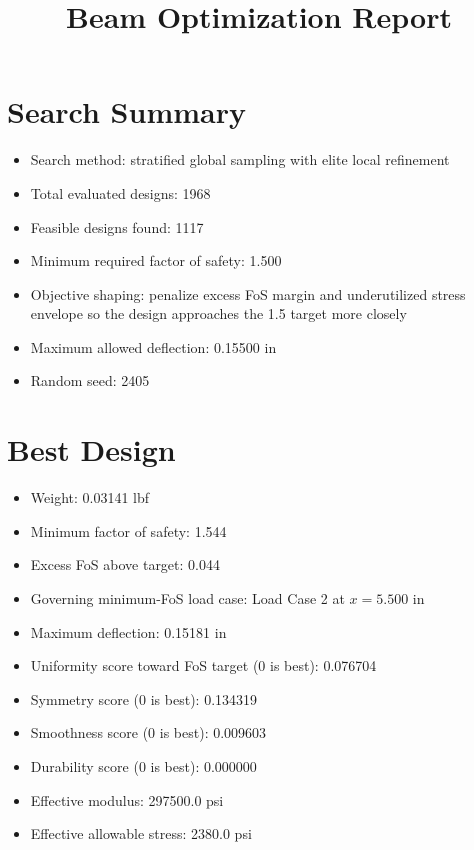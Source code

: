 \documentclass[11pt]{article}
\title{Beam Optimization Report}
\date{}
\begin{document}
\maketitle

\section*{Search Summary}
\begin{itemize}
\item Search method: stratified global sampling with elite local refinement
\item Total evaluated designs: 1968
\item Feasible designs found: 1117
\item Minimum required factor of safety: 1.500
\item Objective shaping: penalize excess FoS margin and underutilized stress envelope so the design approaches the 1.5 target more closely
\item Maximum allowed deflection: 0.15500 in
\item Random seed: 2405
\end{itemize}

\section*{Best Design}
\begin{itemize}
\item Weight: 0.03141 lbf
\item Minimum factor of safety: 1.544
\item Excess FoS above target: 0.044
\item Governing minimum-FoS load case: Load Case 2 at $x=5.500$ in
\item Maximum deflection: 0.15181 in
\item Uniformity score toward FoS target (0 is best): 0.076704
\item Symmetry score (0 is best): 0.134319
\item Smoothness score (0 is best): 0.009603
\item Durability score (0 is best): 0.000000
\item Effective modulus: 297500.0 psi
\item Effective allowable stress: 2380.0 psi
\end{itemize}
\end{document}
